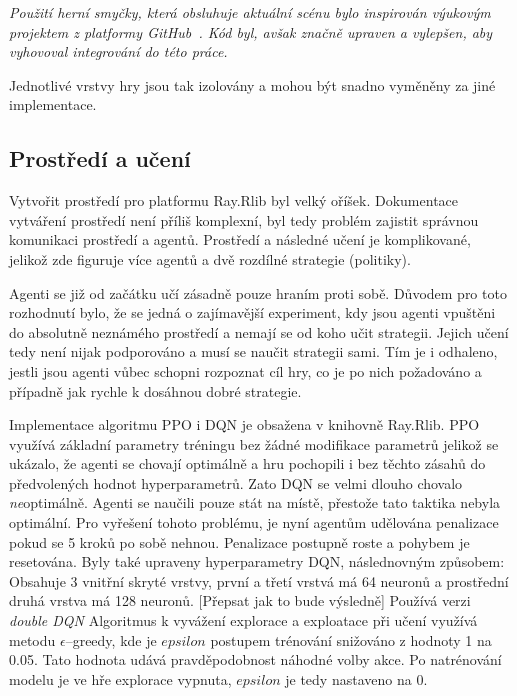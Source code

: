\textit{Použití herní smyčky, která obsluhuje aktuální scénu bylo inspirován výukovým projektem z platformy GitHub~\cite{GameSceneController}.
Kód byl, avšak značně upraven a vylepšen, aby vyhovoval integrování do této práce.}

Jednotlivé vrstvy hry jsou tak izolovány a mohou být snadno vyměněny za jiné implementace.

\subsection{Prostředí a učení}\label{subsec:prostredi}

Vytvořit prostředí pro platformu Ray.Rlib byl velký oříšek.
Dokumentace vytváření prostředí není příliš komplexní, byl tedy problém zajistit správnou komunikaci prostředí a agentů.
Prostředí a následné učení je komplikované, jelikož zde figuruje více agentů a dvě rozdílné strategie (politiky).

Agenti se již od začátku učí zásadně pouze hraním proti sobě.
Důvodem pro toto rozhodnutí bylo, že se jedná o zajímavější experiment, kdy jsou agenti vpuštěni do absolutně neznámého prostředí a nemají se od koho učit strategii.
Jejich učení tedy není nijak podporováno a musí se naučit strategii sami.
Tím je i odhaleno, jestli jsou agenti vůbec schopni rozpoznat cíl hry, co je po nich požadováno a případně jak rychle k dosáhnou dobré strategie.

Implementace algoritmu PPO i DQN je obsažena v knihovně Ray.Rlib.
PPO využívá základní parametry tréningu bez žádné modifikace parametrů jelikož se ukázalo, že agenti se chovají optimálně a hru pochopili i bez těchto zásahů do předvolených hodnot hyperparametrů.
Zato DQN se velmi dlouho chovalo \emph{ne}optimálně.
Agenti se naučili pouze stát na místě, přestože tato taktika nebyla optimální.
Pro vyřešení tohoto problému, je nyní agentům udělována penalizace pokud se 5 kroků po sobě nehnou.
Penalizace postupně roste a pohybem je resetována.
Byly také upraveny hyperparametry DQN, následnovným způsobem:
Obsahuje 3 vnitřní skryté vrstvy, první a třetí vrstvá má 64 neuronů a prostřední druhá vrstva má 128 neuronů.{\color {red} [Přepsat jak to bude výsledně]}
Používá verzi \emph{double DQN}
Algoritmus k vyvážení explorace a exploatace při učení využívá metodu $\epsilon$--greedy, kde je $epsilon$ postupem trénování snižováno z hodnoty 1 na 0.05.
Tato hodnota udává pravděpodobnost náhodné volby akce.
Po natrénování modelu je ve hře explorace vypnuta, $epsilon$ je tedy nastaveno na 0.

